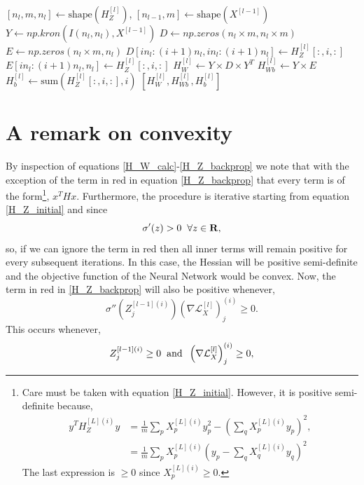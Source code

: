 \documentclass[11pt,twocolumn]{article}
\begin{document}
\begin{algorithm}
\begin{algorithmic}
\EndProcedure
\Statex
{}
	\State $[n_{l},m,n_{l}] \gets \textrm{shape}(H^{[l]}_Z)$, $[n_{l-1},m] \gets \textrm{shape}(X^{[l-1]})$
	\State $Y \gets np.kron(I(n_{l},n_{l}),X^{[l-1]})$
	\State $D \gets np.zeros(n_l \times m, n_l \times m)$
	\State $E \gets np.zeros(n_l \times m, n_l)$	
		\State $D[i n_l:(i+1) n_l, i n_l:(i+1) n_l] \gets H^{[l]}_Z[:,i,:]$
		\State $E[i n_l:(i+1) n_l, n_l] \gets H^{[l]}_Z[:,i,:]$	
	\EndFor
	\State $H^{[l]}_W \gets Y \times D \times Y^T$
	\State $H^{[l]}_{Wb} \gets Y \times E$
	\State $H^{[l]}_{b} \gets \textrm{sum}(H^{[l]}_Z[:,i,:],i)$
	\State \Return $[H^{[l]}_W, H^{[l]}_{Wb}, H^{[l]}_{b} ]$	
\EndProcedure
\end{algorithmic}
\end{algorithm}
\twocolumn
\section{A remark on convexity}\label{app_convex}
By inspection of equations \ref{H_W_calc}-\ref{H_Z_backprop} we note that with the exception of the term in red in equation \ref{H_Z_backprop} that every term is of the form\footnote{Care must be taken with equation \ref{H_Z_initial}. However, it is positive semi-definite because,
\begin{align}
y^T H_{Z}^{[L](i)}y&=\frac{1}{m} \sum_p  X^{[L](i)}_p y_p^2 -(\sum_q X^{[L](i)}_p y_p)^2,\\
&=\frac{1}{m} \sum_p X^{[L](i)}_p(y_p-\sum_q X^{[L](i)}_q y_q)^2
\end{align}
The last expression is $\ge 0$ since $X^{[L](i)}_p \ge 0$.}, $x^{T}Hx$. Furthermore, the procedure is iterative starting from equation \ref{H_Z_initial} and since 
\begin{equation}
\sigma'(z) >0 \hspace{0.2cm} \forall z \in \mathbf{R},
\end{equation}
so, if we can ignore the term in red then all inner terms will remain positive for every subsequent iterations. In this case, the Hessian will be positive semi-definite and the objective function of the Neural Network would be convex. Now, the term in red in \ref{H_Z_backprop} will also be positive whenever,
\begin{equation}
\sigma''{(Z_j^{[l-1](i)})} \left(\nabla \mathcal{L}^{[l]}_{X}\right)_j^{(i)}\ge 0.
\end{equation}
This occurs whenever,
\begin{equation}
Z_j^{[l-1](i)} \ge 0 \hspace{0.2cm} \textrm{and} \hspace{0.2cm}  \left(\nabla \mathcal{L}^{[l]}_{X}\right)_j^{(i)} \ge 0,
\end{equation}
\end{document}
